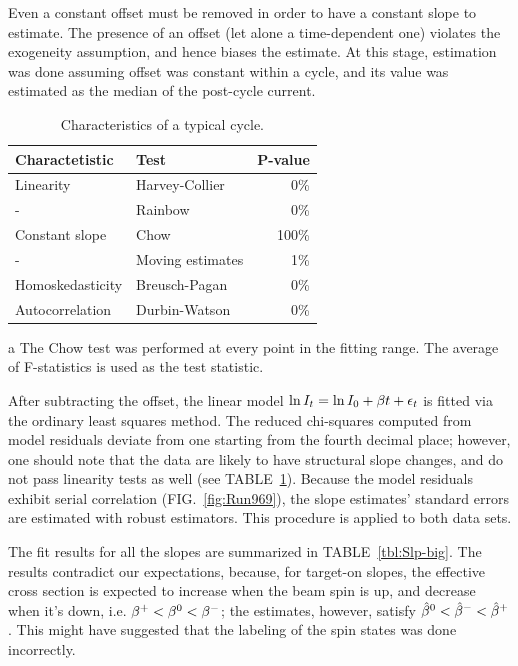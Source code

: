 \documentclass[reprint, superscriptaddress]{revtex4-1}
\begin{document}
Even a constant offset must be removed in order to have a constant slope to estimate. The presence of an offset (let alone a time-dependent one) violates the exogeneity assumption, and hence biases the estimate. At this stage, estimation was done assuming offset was constant within a cycle, and its value was estimated as the median of the post-cycle current.

\begin{table}
\centering
\begin{threeparttable}
	\caption{Characteristics of a typical cycle.\label{tbl:CycleChars}}
	\begin{tabular}{llr}
	\hline\hline
	Charactetistic	& Test 					& P-value\\
	\hline
	Linearity 		& Harvey-Collier		& 0\% \\
	-				& Rainbow				& 0\% \\
	Constant slope	& Chow\tnote{a}		 	& 100\% \\
	-				& Moving estimates		& 1\% \\
	Homoskedasticity& Breusch-Pagan 		& 0\% \\
	Autocorrelation & Durbin-Watson			& 0\% \\
	\hline\hline
	\end{tabular}
	\begin{tablenotes}
		\item[a]{The Chow test was performed at every point in the fitting range. The average of F-statistics is used as the test statistic.}
	\end{tablenotes}
\end{threeparttable}
\end{table}

After subtracting the offset, the linear model $\ln I_t = \ln I_0 + \slp t +\epsilon_t$ is fitted via the ordinary least squares method. The reduced chi-squares computed from model residuals deviate from one starting from the fourth decimal place; however, one should note that the data are likely to have structural slope changes, and do not pass linearity tests as well (see TABLE~\ref{tbl:CycleChars}). Because the model residuals exhibit serial correlation (FIG.~\ref{fig:Run969}), the slope estimates' standard errors are estimated with robust estimators. This procedure is applied to both data sets.

\newcommand{\avg}[1]{\langle #1 \rangle}
The fit results for all the slopes are summarized in TABLE~\ref{tbl:Slp-big}. The results contradict our expectations, because, for target-on slopes, the effective cross section is expected to increase when the beam spin is up, and decrease when it's down, i.e. $\slp^+ < \slp^0 < \slp^-$; the estimates, however, satisfy $\slp*^0 < \slp*^- < \slp*^+$. This might have suggested that the labeling of the spin states was done incorrectly. 
\end{document}
